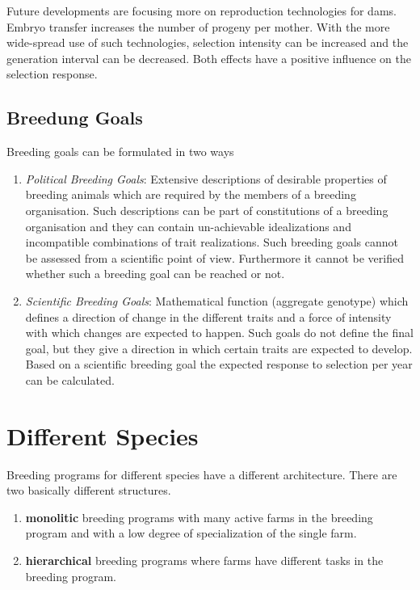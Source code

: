 \documentclass[
]{book}
\providecommand{\tightlist}{%
  \setlength{\itemsep}{0pt}\setlength{\parskip}{0pt}}
\begin{document}
Future developments are focusing more on reproduction technologies for dams. Embryo transfer increases the number of progeny per mother. With the more wide-spread use of such technologies, selection intensity can be increased and the generation interval can be decreased. Both effects have a positive influence on the selection response.

\hypertarget{gel-bprog-breedinggoal}{%
\subsection{Breedung Goals}\label{gel-bprog-breedinggoal}}

Breeding goals can be formulated in two ways

\begin{enumerate}
\def\labelenumi{\arabic{enumi}.}
\tightlist
\item
  \emph{Political Breeding Goals}: Extensive descriptions of desirable properties of breeding animals which are required by the members of a breeding organisation. Such descriptions can be part of constitutions of a breeding organisation and they can contain un-achievable idealizations and incompatible combinations of trait realizations. Such breeding goals cannot be assessed from a scientific point of view. Furthermore it cannot be verified whether such a breeding goal can be reached or not.
\item
  \emph{Scientific Breeding Goals}: Mathematical function (aggregate genotype) which defines a direction of change in the different traits and a force of intensity with which changes are expected to happen. Such goals do not define the final goal, but they give a direction in which certain traits are expected to develop. Based on a scientific breeding goal the expected response to selection per year can be calculated.
\end{enumerate}

\hypertarget{gel-bprog-species}{%
\section{Different Species}\label{gel-bprog-species}}

Breeding programs for different species have a different architecture. There are two basically different structures.

\begin{enumerate}
\def\labelenumi{\arabic{enumi}.}
\tightlist
\item
  \textbf{monolitic} breeding programs with many active farms in the breeding program and with a low degree of specialization of the single farm.
\item
  \textbf{hierarchical} breeding programs where farms have different tasks in the breeding program.
\end{enumerate}
\end{document}
